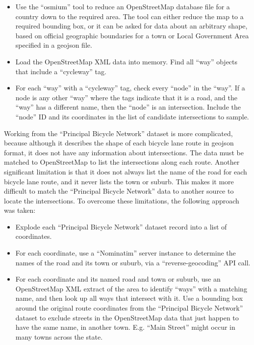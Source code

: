 \documentclass[11pt,twoside]{report}
\begin{document}
\begin{itemize}
\item{Use the ``osmium'' tool to reduce an OpenStreetMap database file for a country down to the required area.  The tool can either reduce the map to a required bounding box, or it can be asked for data about an arbitrary shape, based on official geographic boundaries for a town or Local Government Area specified in a geojson file.}
\item{Load the OpenStreetMap XML data into memory.  Find all ``way'' objects that include a ``cycleway'' tag.}
\item{For each ``way'' with a ``cycleway'' tag, check every ``node'' in the ``way''.  If a node is any other ``way'' where the tags indicate that it is a road, and the ``way'' has a different name, then the ``node'' is an intersection.  Include the ``node'' ID and its coordinates in the list of candidate intersections to sample.}
\end{itemize}

Working from the ``Principal Bicycle Network'' dataset is more complicated, because although it describes the shape of each bicycle lane route in geojson format, it does not have any information about intersections.  The data must be matched to OpenStreetMap to list the intersections along each route.  Another significant limitation is that it does not always list the name of the road for each bicycle lane route, and it never lists the town or suburb.  This makes it more difficult to match the ``Principal Bicycle Network'' data to another source to locate the intersections.  To overcome these limitations, the following approach was taken:

\begin{itemize}
\item{Explode each ``Principal Bicycle Network'' dataset record into a list of coordinates.}
\item{For each coordinate, use a ``Nominatim'' server instance to determine the names of the road and its town or suburb, via a ``reverse-geocoding'' API call.}
\item{For each coordinate and its named road and town or suburb, use an OpenStreetMap XML extract of the area to identify ``ways'' with a matching name, and then look up all ways that intersect with it.  Use a bounding box around the original route coordinates from the ``Principal Bicycle Network'' dataset to exclude streets in the OpenStreetMap data that just happen to have the same name, in another town.  E.g. ``Main Street'' might occur in many towns across the state.}
\end{itemize}
\end{document}
